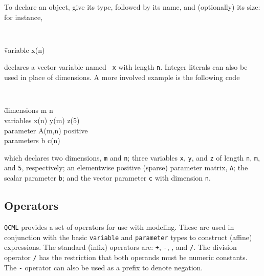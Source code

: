 \documentclass[11pt]{article}
\def\qcml{\texttt{QCML}\xspace}
\begin{document}
To declare an object, give its type, followed by its name, and (optionally) 
its size: for instance,
{\tt
\begin{tabbing}
  \qquad \= variable x(n)
\end{tabbing}}
\noindent declares a vector variable named {\tt
x} with length {\tt n}. 
Integer literals can also be used in place of dimensions. A more involved
example is the following code
{\tt
\begin{tabbing}
  \qquad \= dimensions m n \\
  \> variables x(n) y(m) z(5)\\
  \> parameter A(m,n) positive \\
  \> parameters b c(n)
\end{tabbing}}
\noindent which declares two dimensions, {\tt m} and {\tt n}; three variables
{\tt x}, {\tt y}, and {\tt z} of length {\tt n}, {\tt m}, and {\tt 5},
respectively; an elementwise positive (sparse) parameter matrix, {\tt A}; the
scalar parameter {\tt b}; and the vector parameter {\tt c} with dimension
{\tt n}.

\subsection{Operators}
\qcml provides a set of operators for use with modeling. These are used in
conjunction with the basic {\tt variable} and {\tt parameter} types to
construct (affine) expressions. The standard (infix) operators are: {\tt +},
{\tt -}, {\tt *}, and {\tt /}. The division operator {\tt /} has the
restriction that both operands must be numeric constants. The {\tt -}
operator can also be used as a prefix to denote negation.
\end{document}
